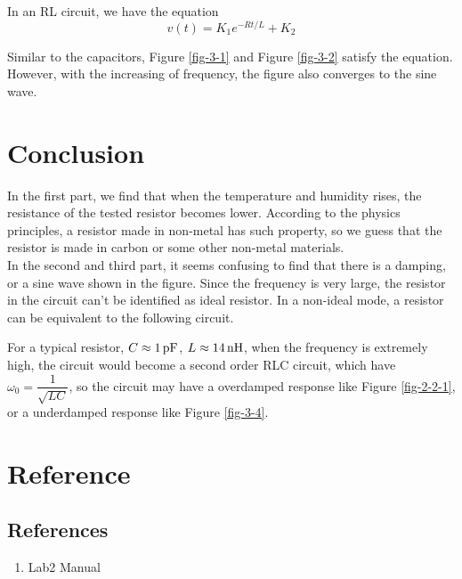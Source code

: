 \documentclass{article}
\newcommand{\unit}[1]{{\rm\,#1}}
\begin{document}
In an RL circuit, we have the equation$$v(t)=K_1e^{-Rt/L}+K_2$$

Similar to the capacitors, Figure \ref{fig-3-1} and Figure \ref{fig-3-2} satisfy the equation. However, with the increasing of frequency, the figure also converges to the sine wave.

\newpage

\section{Conclusion}

In the first part, we find that when the temperature and humidity rises, the resistance of the tested resistor becomes lower. According to the physics principles, a resistor made in non-metal has such property, so we guess that the resistor is made in carbon or some other non-metal materials.\\

In the second and third part, it seems confusing to find that there is a damping, or a sine wave shown in the figure. Since the frequency is very large, the resistor in the circuit can't be identified as ideal resistor. In a non-ideal mode, a resistor can be equivalent to the following circuit.

\begin{center}
\end{center}

For a typical resistor, $C\approx1\unit{pF}$, $L\approx14\unit{nH}$, when the frequency is extremely high, the circuit would become a second order RLC circuit, which have $\omega_0=\dfrac{1}{\sqrt{LC}}$, so the circuit may have a overdamped response like Figure \ref{fig-2-2-1}, or a underdamped response like Figure \ref{fig-3-4}.

\section{Reference}

\subsection{References}
\begin{enumerate}
	\item Lab2 Manual
\end{enumerate}
\end{document}
